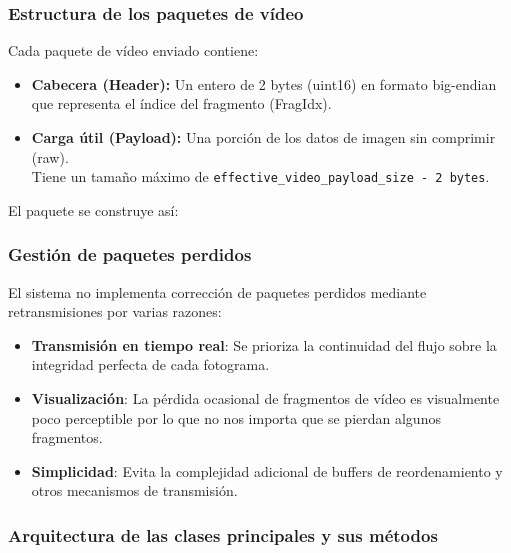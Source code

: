 \subsubsection{Estructura de los paquetes de vídeo}

Cada paquete de vídeo enviado contiene:

\begin{itemize}
    \item \textbf{Cabecera (Header):} Un entero de 2 bytes (uint16) en formato big-endian que representa el índice del fragmento (FragIdx).
    \item \textbf{Carga útil (Payload):} Una porción de los datos de imagen sin comprimir (raw). \\
    Tiene un tamaño máximo de \texttt{effective\_video\_payload\_size - 2 bytes}.
\end{itemize}

\noindent
El paquete se construye así:
\begin{center}
\end{center}

\subsubsection{Gestión de paquetes perdidos}

El sistema no implementa corrección de paquetes perdidos mediante retransmisiones por varias razones:

\begin{itemize}
    \item \textbf{Transmisión en tiempo real}: Se prioriza la continuidad del flujo sobre la integridad perfecta de cada fotograma.
    \item \textbf{Visualización}: La pérdida ocasional de fragmentos de vídeo es visualmente poco perceptible por lo que no nos importa que se pierdan algunos fragmentos.
    \item \textbf{Simplicidad}: Evita la complejidad adicional de buffers de reordenamiento y otros mecanismos de transmisión.
\end{itemize}

\subsubsection{Arquitectura de las clases principales y sus métodos}

